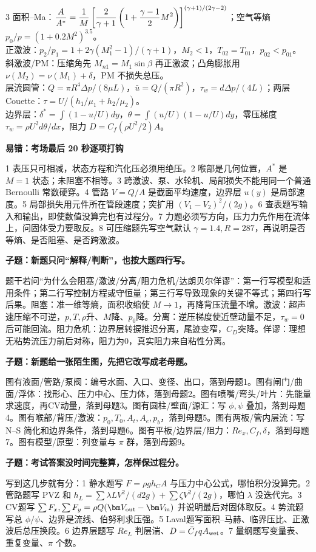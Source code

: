 \documentclass[a4paper]{article}
\newcommand{\qt}[1]{\vspace{0.10pt}\colorbox{Q}{\parbox{\dimexpr\linewidth-2\fboxsep}{\color{white}\bfseries #1}}\par}
\newcommand{\ans}[1]{\colorbox{G}{\parbox{\dimexpr\linewidth-2\fboxsep}{#1}}\par}
\begin{document}
\begin{multicols}{3}
{面积--Ma：$\displaystyle {A\over A^*}={1\over M}\left[{2\over\gamma+1}\left(1+{\gamma-1\over2}M^2\right)\right]^{(\gamma+1)/(2\gamma-2)}$；空气等熵 $p_0/p=(1+0.2M^2)^{3.5}$。\\
正激波：$p_2/p_1=1+2\gamma(M_1^2-1)/(\gamma+1)$，$M_2<1$，$T_{02}=T_{01}$，$p_{02}<p_{01}$。\\
斜激波/PM：压缩角先 $M_{n1}=M_1\sin\beta$ 再正激波；凸角膨胀用 $\nu(M_2)=\nu(M_1)+\delta$，PM 不损失总压。\\
层流圆管：$Q=\pi R^4\Delta p/(8\mu L)$，$\bar u=Q/(\pi R^2)$，$\tau_w=d\Delta p/(4L)$；两层 Couette：$\tau=U/(h_1/\mu_1+h_2/\mu_2)$。\\
边界层：$\delta^*=\int(1-u/U)dy$，$\theta=\int(u/U)(1-u/U)dy$，零压梯度 $\tau_w=\rho U^2 d\theta/dx$，阻力 $D=C_f(\rho U^2/2)A$。}
\qt{易错：考场最后 20 秒逐项打钩}
\ans{1 表压只可相减，状态方程和汽化压必须用绝压。2 喉部是几何位置，$A^*$ 是 $M=1$ 状态；未阻塞不相等。3 跨激波、泵、水轮机、局部损失不能用同一个普通 Bernoulli 常数硬穿。4 管路 $V=Q/A$ 是截面平均速度，边界层 $u(y)$ 是局部速度。5 局部损失用元件所在管段速度；突扩用 $(V_1-V_2)^2/(2g)$。6 查表题写输入和输出，即使数值没算完也有过程分。7 力题必须写方向，压力力先作用在流体上，问固体受力要取反。8 可压缩题先写空气默认 $\gamma=1.4,R=287$，再说明是否等熵、是否阻塞、是否跨激波。}
\qt{子题：新题只问“解释/判断”，也按大题四行写。}
\ans{题干若问“为什么会阻塞/激波/分离/阻力危机/达朗贝尔佯谬”：第一行写模型和适用条件；第二行写控制方程或守恒量；第三行写导致现象的关键不等式；第四行写后果。阻塞：准一维等熵，面积收缩使 $M\to1$，再降背压流量不增。激波：超声速压缩不可逆，$p,T,\rho$升、$M$降、$p_0$降。分离：逆压梯度使近壁动量不足，$\tau_w=0$ 后可能回流。阻力危机：边界层转捩推迟分离，尾迹变窄，$C_D$突降。佯谬：理想无粘势流压力前后对称，阻力为0，真实阻力来自粘性分离。}
\qt{子题：新题给一张陌生图，先把它改写成老母题。}
\ans{图有液面/管路/泵阀：编号水面、入口、变径、出口，落到母题1。图有闸门/曲面/浮体：找形心、压力中心、压力体，落到母题2。图有喷嘴/弯头/叶片：先能量求速度，再CV动量，落到母题3。图有圆柱/壁面/源汇：写 $\phi,\psi$ 叠加，落到母题4。图有喉部/背压/激波：$p_0,T_0,A_t,A_e,p_b$，落到母题5。图有两板/管内层流：写 N--S 简化和边界条件，落到母题6。图有平板/边界层/阻力：$Re_x,C_f,\delta$，落到母题7。图有模型/原型：列变量与 $\pi$ 群，落到母题9。}
\qt{子题：考试答案没时间完整算，怎样保过程分。}
\ans{写到这几步就有分：1 静水题写 $F=\rho gh_CA$ 与压力中心公式，哪怕积分没算完。2 管路题写 PVZ 和 $h_L=\sum\lambda L V^2/(d2g)+\sum\zeta V^2/(2g)$，哪怕 $\lambda$ 没迭代完。3 CV题写 $\sum F_x,\sum F_y=\rho Q(\bm V_{\rm out}-\bm V_{\rm in})$ 并说明最后对固体取反。4 势流题写总 $\phi/\psi$、边界是流线、伯努利求压强。5 Laval题写面积--马赫、临界压比、正激波后总压换段。6 边界层题写 $Re_L$ 判层湍、$D=\bar C_f qA_{\rm wet}$。7 量纲题写变量表、重复变量、$\pi$ 个数。}

\end{multicols}
\end{document}
